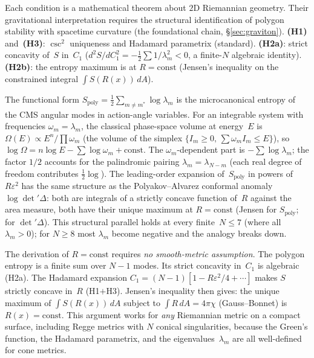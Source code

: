 \begin{remark}
\label{rmk:logical-status}
Each condition is a mathematical theorem about
$2$D Riemannian geometry.
Their gravitational interpretation requires the
structural identification of polygon stability with
spacetime curvature (the foundational chain,
\S\ref{sec:graviton}).
\textbf{(H1)} and~\textbf{(H3)}: $\csc^2$ uniqueness
and Hadamard parametrix (standard).
\textbf{(H2a)}: strict concavity of~$S$ in~$C_1$
($d^2S/dC_1^2 = -\tfrac{1}{2}\sum 1/\lambda_m^2 < 0$,
a finite-$N$ algebraic identity).
\textbf{(H2b)}: the entropy maximum is at $R = \mathrm{const}$
(Jensen's inequality on the constrained integral
$\int S(R(x))\,dA$).

The functional form $S_{\mathrm{poly}} = \tfrac{1}{2}\sum_{m \neq m^*}
\log\lambda_m$ is the microcanonical entropy of the
CMS angular modes in action-angle variables.
For an integrable system with frequencies $\omega_m = \lambda_m$,
the classical phase-space volume at energy~$E$ is
$\Omega(E) \propto E^n/\!\prod\omega_m$
(the volume of the simplex $\{I_m \ge 0,\,\sum\omega_m I_m \le E\}$),
so $\log\Omega = n\log E - \sum\log\omega_m + \mathrm{const}$.
The $\omega_m$-dependent part is $-\sum\log\lambda_m$;
the factor $1/2$ accounts for the palindromic pairing
$\lambda_m = \lambda_{N-m}$ (each real degree of freedom
contributes $\tfrac{1}{2}\log$).
The leading-order expansion of~$S_{\mathrm{poly}}$
in powers of~$R\varepsilon^2$ has the same structure as
the Polyakov--Alvarez conformal anomaly
$\log\det'\Delta$: both are integrals of a strictly
concave function of~$R$ against the area measure,
both have their unique maximum at $R = \mathrm{const}$
(Jensen for $S_{\mathrm{poly}}$;
\citealt{OsgoodPhillipsSarnak1988} for $\det'\Delta$).
This structural parallel holds at every finite~$N \le 7$
(where all $\lambda_m > 0$); for $N \ge 8$ most
$\lambda_m$ become negative and the analogy breaks down.

The derivation of $R = \mathrm{const}$ requires
\emph{no smooth-metric assumption}.
The polygon entropy is a finite sum over $N{-}1$ modes.
Its strict concavity in~$C_1$ is algebraic (H2a).
The Hadamard expansion $C_1 = (N{-}1)[1 - R\varepsilon^2/4 + \cdots]$
makes $S$ strictly concave in~$R$ (H1$+$H3).
Jensen's inequality then gives: the unique maximum of
$\int S(R(x))\,dA$ subject to $\int R\,dA = 4\pi\chi$
(Gauss--Bonnet) is $R(x) = \mathrm{const}$.
This argument works for \emph{any} Riemannian metric
on a compact surface, including Regge metrics with $N$
conical singularities, because the Green's function,
the Hadamard parametrix, and the eigenvalues~$\lambda_m$
are all well-defined for cone metrics.


\end{remark}
